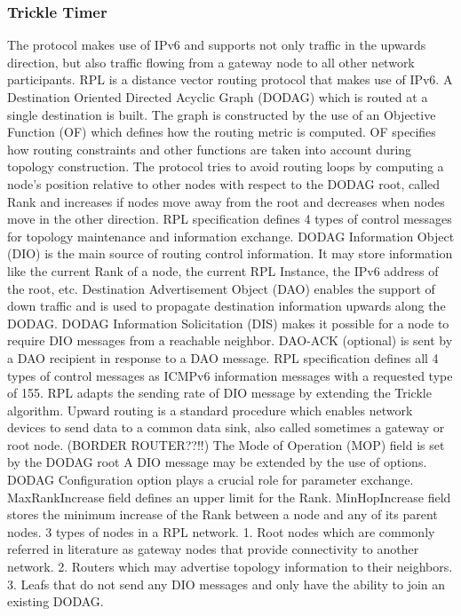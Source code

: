 \subsubsection{Trickle Timer}
The protocol makes use of IPv6 and supports not only traffic in the upwards direction, but also traffic flowing from a gateway node to all other network participants.
	RPL is a distance vector routing protocol that makes use of IPv6. A Destination Oriented Directed Acyclic Graph (DODAG) which is routed at a single destination is built. 
	The graph is constructed by the use of an Objective Function (OF) which defines how the routing metric is computed. OF specifies how routing constraints and other functions are taken into account during topology construction. The protocol tries to avoid routing loops by computing a node’s position relative to other nodes with respect to the DODAG root, called Rank and increases if nodes move away from the root and decreases when nodes move in the other direction. 
	RPL specification defines 4 types of control messages for topology maintenance and information exchange. DODAG Information Object (DIO) is the main source of routing control information. It may store information like the current Rank of a node, the current RPL Instance, the IPv6 address of the root, etc. Destination Advertisement Object (DAO) enables the support of down traffic and is used to propagate destination information upwards along the DODAG. DODAG Information Solicitation (DIS) makes it possible for a node to require DIO messages from a reachable neighbor. DAO-ACK (optional) is sent by a DAO recipient in response to a DAO message. RPL specification defines all 4 types of control messages as ICMPv6 information messages with a requested type of 155.
	RPL adapts the sending rate of DIO message by extending the Trickle algorithm.
	Upward routing is a standard procedure which enables network devices to send data to a common data sink, also called sometimes a gateway or root node. (BORDER ROUTER??!!)
	The Mode of Operation (MOP) field is set by the DODAG root 
	A DIO message may be extended by the use of options. DODAG Configuration option plays a crucial role for parameter exchange. MaxRankIncrease field defines an upper limit for the Rank. MinHopIncrease field stores the minimum increase of the Rank between a node and any of its parent nodes.
	3 types of nodes in a RPL network. 1. Root nodes which are commonly referred in literature as gateway nodes that provide connectivity to another network. 2. Routers which may advertise topology information to their neighbors. 3. Leafs that do not send any DIO messages and only have the ability to join an existing DODAG. 
